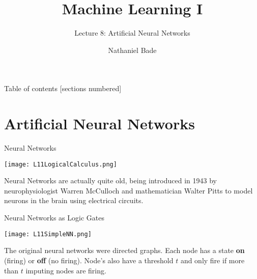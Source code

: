 \documentclass[10pt, table, dvipsnames,xcdraw, handout]{beamer}
\title{Machine Learning I}
\subtitle{Lecture 8: Artificial Neural Networks}
\date{}
\author{Nathaniel Bade}
\institute{Northeastern University Department of Mathematics}
\begin{document}
\maketitle

\begin{frame}{Table of contents}
  [sections numbered]
  \tableofcontents[hideallsubsections]
\end{frame}






\section{Artificial Neural Networks}
\begin{frame}[fragile]{Neural Networks}

  \begin{minipage}[t][0.5\textheight][t]{\textwidth}
	\centering \texttt{[image: L11LogicalCalculus.png]} 
  \end{minipage}
  \vfill
\begin{minipage}[t][0.5\textheight][t]{\textwidth}
Neural Networks are actually quite old, being introduced in 1943 by neurophysiologist Warren McCulloch and mathematician Walter Pitts to model neurons in the brain using electrical circuits.
\end{minipage}
\end{frame}




\begin{frame}[fragile]{Neural Networks as Logic Gates}
  \begin{minipage}[t][0.5\textheight][t]{\textwidth}
	\centering \texttt{[image: L11SimpleNN.png]} 
  \end{minipage}
  \vfill
\begin{minipage}[t][0.5\textheight][t]{\textwidth}



The original neural networks were directed graphs. Each node has a state \textbf{on} (firing) or \textbf{off} (no firing). \pause Node's also have a threshold $t$ and only fire if more than $t$ imputing nodes are firing.

\end{minipage}
\end{frame}
\end{document}

